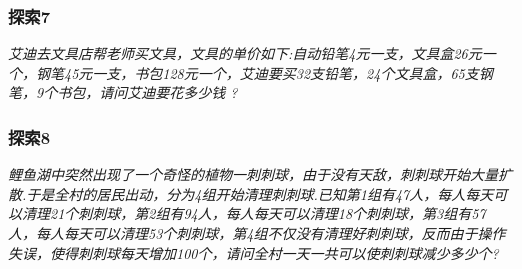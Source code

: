 \begin{frame}
    \frametitle{探索7}
    \textit{艾迪去文具店帮老师买文具，文具的单价如下:自动铅笔4元一支，文具盒26元一个，钢笔45元一支，书包128元一个，艾迪要买32支铅笔，24个文具盒，65支钢笔，9个书包，请问艾迪要花多少钱 ?}
\end{frame}

\begin{frame}
    \frametitle{探索8}
    \textit{鲤鱼湖中突然出现了一个奇怪的植物一刺刺球，由于没有天敌，刺刺球开始大量扩散.于是全村的居民出动，分为4组开始清理刺刺球.已知第1组有47人，每人每天可以清理21个刺刺球，第2组有94人，每人每天可以清理18个刺刺球，第3组有57人，每人每天可以清理53个刺刺球，第4组不仅没有清理好刺刺球，反而由于操作失误，使得刺刺球每天增加100个，请问全村一天一共可以使刺刺球减少多少个?}
\end{frame}